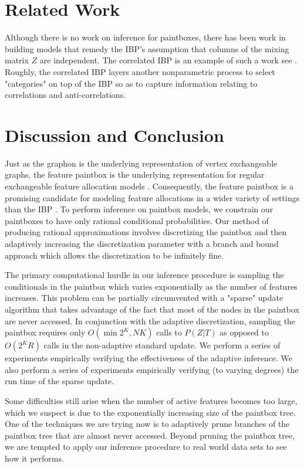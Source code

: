 \documentclass{article}
\begin{document}
\section{Related Work}
Although there is no work on inference for paintboxes, there has been work in building models that remedy the IBP's assumption that columns of the mixing matrix $Z$ are independent.  The correlated IBP is an example of such a work see \cite{DG12}.  Roughly, the correlated IBP layers another nonparametric process to select "categories" on top of the IBP so as to capture information relating to correlations and anti-correlations.      

\section{Discussion and Conclusion} \label{conclusion}
Just as the graphon is the underlying representation of vertex exchangeable graphs, the feature paintbox is the underlying representation for regular exchangeable feature allocation models \cite{BJP13}.  Consequently, the feature paintbox is a promising candidate for modeling feature allocations in a wider variety of settings than the IBP \cite{gg11}.  To perform inference on paintbox models, we constrain our paintboxes to have only rational conditional probabilities.  Our method of producing rational approximations involves discretizing the paintbox and then adaptively increasing the discretization parameter with a branch and bound approach which allows the discretization to be infinitely fine.  

The primary computational hurdle in our inference procedure is sampling the conditionals in the paintbox which varies exponentially as the number of features increases.  This problem can be partially circumvented with a "sparse" update algorithm that takes advantage of the fact that most of the nodes in the paintbox are never accessed.  In conjunction with the adaptive discretization, sampling the paintbox requires only $O(\min{2^K,NK})$ calls to $P(Z|T)$ as opposed to $O(2^KR)$ calls in the non-adaptive standard update.  We perform a series of experiments empirically verifying the effectiveness of the adaptive inference.  We also perform a series of experiments empirically verifying (to varying degrees) the run time of the sparse update.  

Some difficulties still arise when the number of active features becomes too large, which we suspect is due to the exponentially increasing size of the paintbox tree.  One of the techniques we are trying now is to adaptively prune branches of the paintbox tree that are almost never accessed.  Beyond pruning the paintbox tree, we are tempted to apply our inference procedure to real world data sets to see how it performs.  
\end{document}

